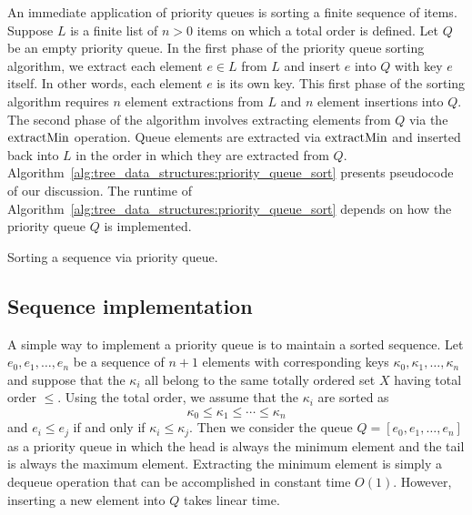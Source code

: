 An immediate application of priority queues is sorting a finite
sequence of items. Suppose $L$ is a finite list of $n > 0$ items on
which a total order is defined. Let $Q$ be an empty priority queue. In
the first phase of the priority queue sorting algorithm, we extract
each element $e \in L$ from $L$ and insert $e$ into $Q$ with key $e$
itself. In other words, each element $e$ is its own key. This first
phase of the sorting algorithm requires $n$ element extractions from
$L$ and $n$ element insertions into $Q$. The second phase of the
algorithm involves extracting elements from $Q$ via the $\operatorname*{extractMin}$
operation. Queue elements are extracted via $\operatorname*{extractMin}$ and inserted
back into $L$ in the order in which they are extracted from
$Q$. Algorithm~\ref{alg:tree_data_structures:priority_queue_sort}
presents pseudocode of our discussion. The runtime of
Algorithm~\ref{alg:tree_data_structures:priority_queue_sort} depends
on how the priority queue $Q$ is implemented.

\begin{algorithm}[!htbp]

\caption{Sorting a sequence via priority queue.}
\label{alg:tree_data_structures:priority_queue_sort}
\end{algorithm}



\subsection{Sequence implementation}
\label{subsec:tree_data_structures:sequence_implementation}

A simple way to implement a priority queue is to maintain a sorted
sequence. Let $e_0, e_1, \dots, e_n$ be a sequence of $n + 1$ elements
with corresponding keys $\kappa_0, \kappa_1, \dots, \kappa_n$ and
suppose that the $\kappa_i$ all belong to the same totally ordered set
$X$ having total order $\leq$. Using the total order, we assume that
the $\kappa_i$ are sorted as
\[
\kappa_0 \leq \kappa_1 \leq \cdots \leq \kappa_n
\]
and $e_i \leq e_j$ if and only if $\kappa_i \leq \kappa_j$. Then we
consider the queue $Q = [e_0, e_1, \dots, e_n]$ as a priority queue in
which the head is always the minimum element and the tail is always
the maximum element. Extracting the minimum element is simply a
dequeue operation that can be accomplished in constant time
$O(1)$. However, inserting a new element into $Q$ takes linear time.


